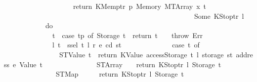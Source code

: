 \begin{isabellebody}
\ \ \ \ \ \ \ \ \ \ \ \ \ \ \ \ \ \ \ \ return\ {\isacharparenleft}{\kern0pt}KMemptr\ p{\isacharcomma}{\kern0pt}\ Memory\ {\isacharparenleft}{\kern0pt}MTArray\ x\ t{\isacharprime}{\kern0pt}{\isacharprime}{\kern0pt}{\isacharparenright}{\kern0pt}{\isacharparenright}{\kern0pt}\isanewline
\ \ \ \ \ \ \ \ \ \ \ \ \ \ \ \ \ \ {\isacharbraceright}{\kern0pt}\isanewline
\ \ \ \ \ \ \ \ \ \ \ \ \ \ {\isacharparenright}{\kern0pt}\isanewline
\ \ \ \ \ \ \ \ \ \ \ \ {\isacharbraceright}{\kern0pt}\isanewline
\ \ \ \ \ \ \ \ {\isacharbar}{\kern0pt}\ Some\ {\isacharparenleft}{\kern0pt}KStoptr\ l{\isacharprime}{\kern0pt}{\isacharparenright}{\kern0pt}\ {\isasymRightarrow}\isanewline
\ \ \ \ \ \ \ \ \ \ \ \ do\ {\isacharbraceleft}{\kern0pt}\isanewline
\ \ \ \ \ \ \ \ \ \ \ \ \ \ t\ {\isasymleftarrow}\ case\ tp\ of\ Storage\ t\ {\isasymRightarrow}\ return\ t\ {\isacharbar}{\kern0pt}\ {\isacharunderscore}{\kern0pt}\ {\isasymRightarrow}\ throw\ Err{\isacharsemicolon}{\kern0pt}\isanewline
\ \ \ \ \ \ \ \ \ \ \ \ \ \ {\isacharparenleft}{\kern0pt}l{\isacharprime}{\kern0pt}{\isacharprime}{\kern0pt}{\isacharcomma}{\kern0pt}\ t{\isacharprime}{\kern0pt}{\isacharparenright}{\kern0pt}\ {\isasymleftarrow}\ ssel\ t\ l{\isacharprime}{\kern0pt}\ r\ e\ cd\ st{\isacharsemicolon}{\kern0pt}\isanewline
\ \ \ \ \ \ \ \ \ \ \ \ \ \ {\isacharparenleft}{\kern0pt}case\ t{\isacharprime}{\kern0pt}\ of\isanewline
\ \ \ \ \ \ \ \ \ \ \ \ \ \ \ \ STValue\ t{\isacharprime}{\kern0pt}{\isacharprime}{\kern0pt}\ {\isasymRightarrow}\ return\ {\isacharparenleft}{\kern0pt}KValue\ {\isacharparenleft}{\kern0pt}accessStorage\ t{\isacharprime}{\kern0pt}{\isacharprime}{\kern0pt}\ l{\isacharprime}{\kern0pt}{\isacharprime}{\kern0pt}\ {\isacharparenleft}{\kern0pt}storage\ st\ {\isacharparenleft}{\kern0pt}address\ e{\isacharparenright}{\kern0pt}{\isacharparenright}{\kern0pt}{\isacharparenright}{\kern0pt}{\isacharcomma}{\kern0pt}\ Value\ t{\isacharprime}{\kern0pt}{\isacharprime}{\kern0pt}{\isacharparenright}{\kern0pt}\isanewline
\ \ \ \ \ \ \ \ \ \ \ \ \ \ {\isacharbar}{\kern0pt}\ STArray\ {\isacharunderscore}{\kern0pt}\ {\isacharunderscore}{\kern0pt}\ {\isasymRightarrow}\ return\ {\isacharparenleft}{\kern0pt}KStoptr\ l{\isacharprime}{\kern0pt}{\isacharprime}{\kern0pt}{\isacharcomma}{\kern0pt}\ Storage\ t{\isacharprime}{\kern0pt}{\isacharparenright}{\kern0pt}\isanewline
\ \ \ \ \ \ \ \ \ \ \ \ \ \ {\isacharbar}{\kern0pt}\ STMap\ {\isacharunderscore}{\kern0pt}\ {\isacharunderscore}{\kern0pt}\ \ \ {\isasymRightarrow}\ return\ {\isacharparenleft}{\kern0pt}KStoptr\ l{\isacharprime}{\kern0pt}{\isacharprime}{\kern0pt}{\isacharcomma}{\kern0pt}\ Storage\ t{\isacharprime}{\kern0pt}{\isacharparenright}{\kern0pt}{\isacharparenright}{\kern0pt}\isanewline

\end{isabellebody}
